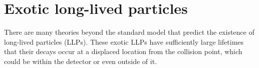 \section{Exotic long-lived particles}
\begin{comment}
More details on LL theories (see LLP thesis, rob slides, my IC/SUSY slides 
etc.), R-hadron, displaced-X searches, GMSB? Note that LLPs exist in SM – call 
them BSMLLPs or LL DM/SUSY signatures? – no, exotic LLPs!
\end{comment}
There are many theories beyond the standard model that predict the existence of 
long-lived particles (LLPs). These exotic LLPs have sufficiently large 
lifetimes that their decays occur at a displaced location from the collision 
point, which could be within the detector or even outside of it. 

